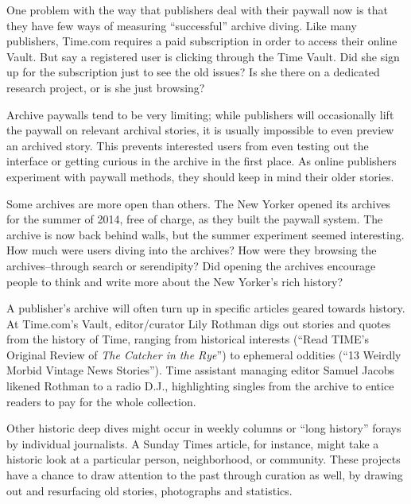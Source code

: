 One problem with the way that publishers deal with their paywall now is that they have few ways of measuring ``successful'' archive diving. Like many publishers, Time.com requires a paid subscription in order to access their online Vault. But say a registered user is clicking through the Time Vault. Did she sign up for the subscription just to see the old issues? Is she there on a dedicated research project, or is she just browsing?

Archive paywalls tend to be very limiting; while publishers will occasionally lift the paywall on relevant archival stories, it is usually impossible to even preview an archived story. This prevents interested users from even testing out the interface or getting curious in the archive in the first place. As online publishers experiment with paywall methods, they should keep in mind their older stories.

Some archives are more open than others. The New Yorker opened its archives for the summer of 2014, free of charge, as they built the paywall system. The archive is now back behind walls, but the summer experiment seemed interesting. How much were users diving into the archives? How were they browsing the archives--through search or serendipity? Did opening the archives encourage people to think and write more about the New Yorker's rich history?


A publisher's archive will often turn up in specific articles geared towards history. At Time.com's Vault, editor/curator Lily Rothman digs out stories and quotes from the history of Time, ranging from historical interests (``Read TIME's Original Review of \emph{The Catcher in the Rye}'') to ephemeral oddities (``13 Weirdly Morbid Vintage News Stories''). Time assistant managing editor Samuel Jacobs likened Rothman to a radio D.J., highlighting singles from the archive to entice readers to pay for the whole collection.\autocite{}

Other historic deep dives might occur in weekly columns or ``long history'' forays by individual journalists. A Sunday Times article, for instance, might take a historic look at a particular person, neighborhood, or community. These projects have a chance to draw attention to the past through curation as well, by drawing out and resurfacing old stories, photographs and statistics.


